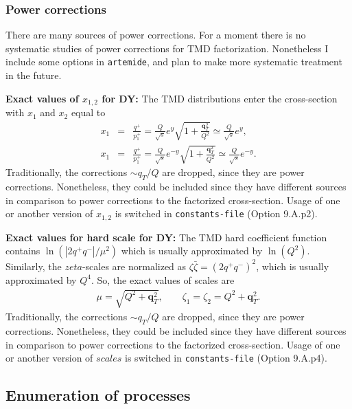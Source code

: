 \documentclass[prd,nofootinbib,eqsecnum,final]{revtex4}
\newcommand{\nn}{\nonumber}
\renewcommand{\(}{\left(}
\renewcommand{\)}{\right)}
\renewcommand{\[}{\left[}
\renewcommand{\]}{\right]}
\renewcommand{\vec}[1]{\bm{#1}}
\begin{document}
\subsubsection{Power corrections}

There are many sources of power corrections. For a moment there is no systematic studies of power corrections for TMD factorization. Nonetheless I include some options in \texttt{artemide}, and plan to make more systematic treatment in the future.

\textbf{Exact values of $x_{1,2}$ for DY:} The TMD distributions enter the cross-section with $x_1$ and $x_2$ equal to
\begin{eqnarray}
x_1&=&\frac{q^+}{p_1^+}=\frac{Q}{\sqrt{s}}e^y\sqrt{1+\frac{\vec q_T^2}{Q^2}}\simeq \frac{Q}{\sqrt{s}}e^y,
\\\nn
x_1&=&\frac{q^+}{p_1^+}=\frac{Q}{\sqrt{s}}e^{-y}\sqrt{1+\frac{\vec q_T^2}{Q^2}} \simeq \frac{Q}{\sqrt{s}}e^{-y}.
\end{eqnarray}
Traditionally, the corrections $\sim q_T/Q$ are dropped, since they are power corrections. Nonetheless, they could be included since they have different sources in comparison to power corrections to the factorized cross-section. Usage of one or another version of $x_{1,2}$ is switched in \texttt{constants-file} (Option 9.A.p2).

\textbf{Exact values for hard scale for DY:} The TMD hard coefficient function contains $\ln(|2q^+q^-|/\mu^2)$ which is usually approximated by $\ln(Q^2)$. Similarly, the $zeta$-scales are normalized as $\zeta \bar \zeta=(2q^+q^-)^2$, which is usually approximated by $Q^4$. So, the exact values of scales are
\begin{eqnarray}
\mu=\sqrt{Q^2+\vec q_T^2},\qquad \zeta_1=\zeta_2=Q^2+\vec q_T^2.
\end{eqnarray}
Traditionally, the corrections $\sim q_T/Q$ are dropped, since they are power corrections. Nonetheless, they could be included since they have different sources in comparison to power corrections to the factorized cross-section. Usage of one or another version of $scales$ is switched in \texttt{constants-file} (Option 9.A.p4).


\subsection{Enumeration of processes}
\end{document}
